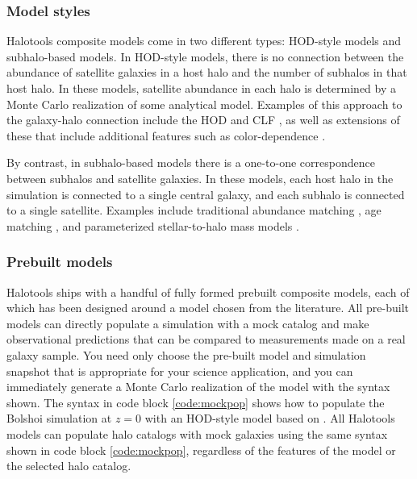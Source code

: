 \documentclass[twocolumn, tighten]{aastex6}
\begin{document}
\subsubsection{Model styles}
\label{subsubsection:modelstyles}

Halotools composite models come in two different types: HOD-style models and subhalo-based models. In HOD-style models, there is no connection between the abundance of satellite galaxies in a host halo and the number of subhalos in that host halo. In these models, satellite abundance in each halo is determined by a Monte Carlo realization of some analytical model. Examples of this approach to the galaxy-halo connection include the HOD \citep{berlind02} and CLF \citep{yang03}, as well as extensions of these that include additional features such as color-dependence \citep{tinker_etal13}. 

By contrast, in subhalo-based models there is a one-to-one correspondence between subhalos and satellite galaxies. In these models, each host halo in the simulation is connected to a single central galaxy, and each subhalo is connected to a single satellite. Examples include traditional abundance matching \citep{kravtsov04a,conroy06}, age matching \citep{HW13a}, and parameterized stellar-to-halo mass models  \citep{behroozi10, moster10}.

\subsubsection{Prebuilt models}
\label{subsubsection:prebuiltmodels}

Halotools ships with a handful of fully formed prebuilt composite models, each of which has been designed around a model chosen from the literature. All pre-built models can directly populate a simulation with a mock catalog and make observational predictions that can be compared to measurements made on a real galaxy sample. You need only choose the pre-built model and simulation snapshot that is appropriate for your science application, and you can immediately generate a Monte Carlo realization of the model with the syntax shown. The syntax in code block \ref{code:mockpop} shows how to populate the Bolshoi simulation at $z=0$ with an HOD-style model based on \citet{leauthaud11b}. All Halotools models can populate halo catalogs with mock galaxies using the same syntax shown in code block \ref{code:mockpop}, regardless of the features of the model or the selected halo catalog. 
 
\end{document}
